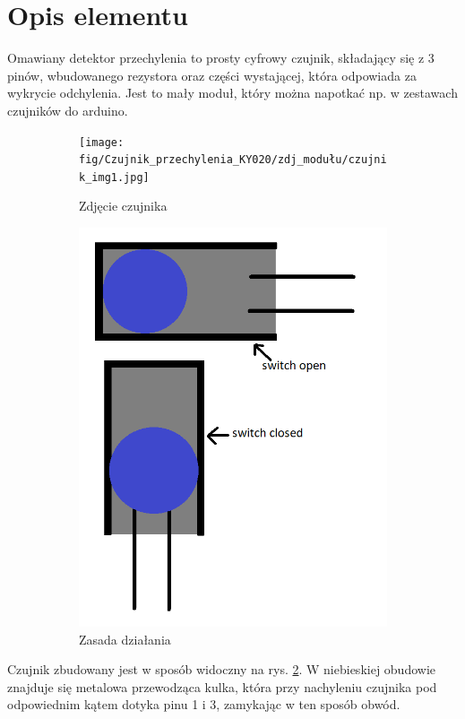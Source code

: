 \documentclass[11pt, a4paper]{article}
\author{Anna Nasierowska}
\begin{document}
%
%
\newpage

\section*{Opis elementu} 
Omawiany detektor przechylenia to prosty cyfrowy czujnik, składający się z 3 pinów, wbudowanego rezystora oraz części wystającej, która odpowiada za wykrycie odchylenia. Jest to mały moduł, który można napotkać np. w zestawach czujników do arduino. 


\vspace{0.5cm}
\begin{figure}[h]
\centering
\begin{subfigure}{.5\textwidth}
  \centering
  \texttt{[image: fig/Czujnik\_przechylenia\_KY020/zdj\_modułu/czujnik\_img1.jpg]}
  \caption{Zdjęcie czujnika}
  \label{fig:sub1}
\end{subfigure}%
\begin{subfigure}{.5\textwidth}
  \centering
    \includegraphics[width=.4\textwidth]{fig/Czujnik_przechylenia_KY020/zasada_dzialania/schemat.png}
      \caption{Zasada działania}
  \label{zd}
\end{subfigure}
\caption{}
\label{fig:test}
\end{figure}
\vspace{0.5cm}

Czujnik zbudowany jest w sposób widoczny na rys. \ref{zd}. W niebieskiej obudowie znajduje się metalowa przewodząca kulka, która przy nachyleniu czujnika pod odpowiednim kątem dotyka pinu 1 i 3, zamykając w ten sposób obwód. 
\end{document}
